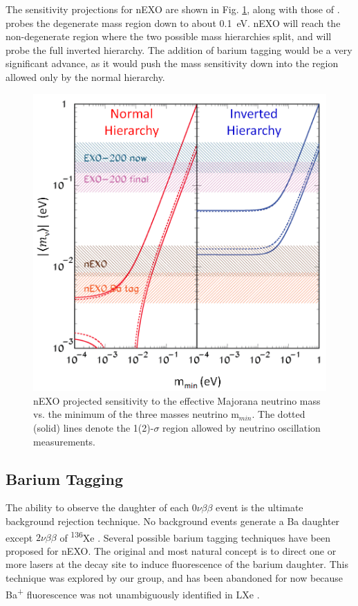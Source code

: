 The sensitivity projections for nEXO are shown in Fig. \ref{fig:sensitivity_nEXO}, along with those of .   probes the degenerate mass region down to about 0.1~eV.  nEXO will reach the non-degenerate region where the two possible mass hierarchies split, and will probe the full inverted hierarchy.  The addition of barium tagging would be a very significant advance, as it would push the mass sensitivity down into the region allowed only by the normal hierarchy.


\begin{figure} %
	\centering
	\includegraphics[width=.7\textwidth]{figures/sensitivity_v3.png}
	\caption{nEXO projected sensitivity to the effective Majorana neutrino mass vs. the minimum of the three masses neutrino m$_{min}$.  The dotted (solid) lines denote the 1(2)-$\sigma$ region allowed by neutrino oscillation measurements.}
\label{fig:sensitivity_nEXO}
\end{figure}

\subsection{Barium Tagging}

The ability to observe the daughter of each $0\nu\beta\beta$ event is the ultimate background rejection technique.  No background events generate a Ba daughter except $2\nu\beta\beta$ of \textsuperscript{136}Xe \cite{Moe1991}.  Several possible barium tagging techniques have been proposed for nEXO.  The original and most natural concept is to direct one or more lasers at the decay site to induce fluorescence of the barium daughter.  This technique was explored by our group, and has been abandoned for now because Ba\textsuperscript{+} fluorescence was not unambiguously identified in LXe \cite{Kendy}.

